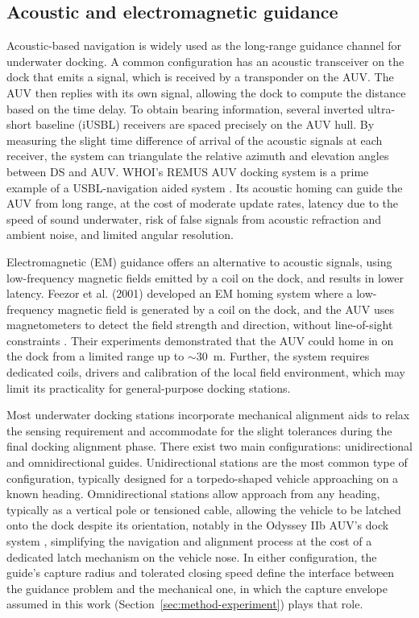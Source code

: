\subsection{Acoustic and electromagnetic guidance}

Acoustic-based navigation is widely used as the long-range guidance channel for underwater docking. A common configuration has an acoustic transceiver on the dock that emits a signal, which is received by a transponder on the AUV. The AUV then replies with its own signal, allowing the dock to compute the distance based on the time delay. To obtain bearing information, several inverted ultra-short baseline (iUSBL) receivers are spaced precisely on the AUV hull. By measuring the slight time difference of arrival of the acoustic signals at each receiver, the system can triangulate the relative azimuth and elevation angles between DS and AUV. WHOI's REMUS AUV docking system is a prime example of a USBL-navigation aided system \cite{4099107}. Its acoustic homing can guide the AUV from long range, at the cost of moderate update rates, latency due to the speed of sound underwater, risk of false signals from acoustic refraction and ambient noise, and limited angular resolution.

Electromagnetic (EM) guidance offers an alternative to acoustic signals, using low-frequency magnetic fields emitted by a coil on the dock, and results in lower latency. Feezor et al. (2001) developed an EM homing system where a low-frequency magnetic field is generated by a coil on the dock, and the AUV uses magnetometers to detect the field strength and direction, without line-of-sight constraints \cite{feezor2001autonomous}. Their experiments demonstrated that the AUV could home in on the dock from a limited range up to $\sim$30~m. Further, the system requires dedicated coils, drivers and calibration of the local field environment, which may limit its practicality for general-purpose docking stations.

Most underwater docking stations incorporate mechanical alignment aids to relax the sensing requirement and accommodate for the slight tolerances during the final docking alignment phase. There exist two main configurations: unidirectional and omnidirectional guides. Unidirectional stations are the most common type of configuration, typically designed for a torpedo-shaped vehicle approaching on a known heading. Omnidirectional stations allow approach from any heading, typically as a vertical pole or tensioned cable, allowing the vehicle to be latched onto the dock despite its orientation, notably in the Odyssey IIb AUV's dock system \cite{972084}, simplifying the navigation and alignment process at the cost of a dedicated latch mechanism on the vehicle nose. In either configuration, the guide's capture radius and tolerated closing speed define the interface between the guidance problem and the mechanical one, in which the capture envelope assumed in this work (Section~\ref{sec:method-experiment}) plays that role.
